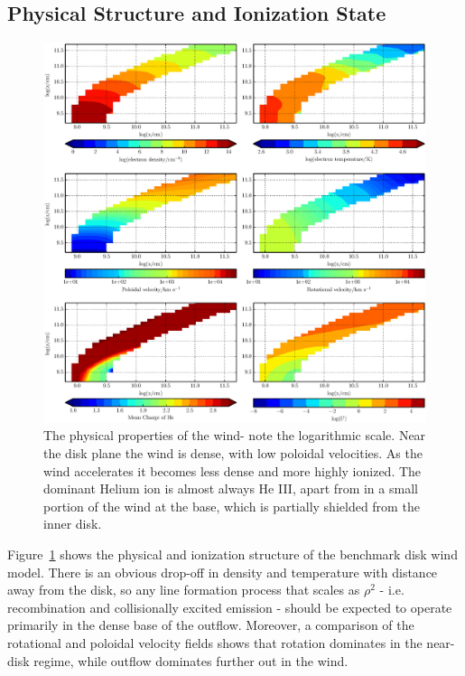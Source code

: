 \documentclass[preprint, a4paper, 11pt]{aastex}
\begin{document}
\subsection{Physical Structure and Ionization State}
\label{modela_ionization}

\begin{figure} %
\includegraphics[width=\textwidth]{figures/fig5.eps}
\caption{
The physical properties of the wind- note the logarithmic scale. 
Near the disk plane the wind is dense, with low poloidal velocities.
As the wind accelerates it becomes less dense
and more highly ionized. The dominant Helium ion
is almost always He III, apart from in a small
portion of the wind at the base, which is partially shielded
from the inner disk.
}
\label{wind}
\end{figure} %

Figure~\ref{wind} shows the physical and ionization structure 
of the benchmark disk wind model. There is an obvious drop-off in density
and temperature with distance away from the disk, so any line
formation process that scales as $\rho^2$ - i.e. recombination and
collisionally excited emission - should be expected to operate
primarily in the dense base of the outflow. Moreover, a comparison of
the rotational and poloidal velocity fields shows that rotation
dominates in the near-disk regime, while outflow dominates further out
in the wind. 
\end{document}
